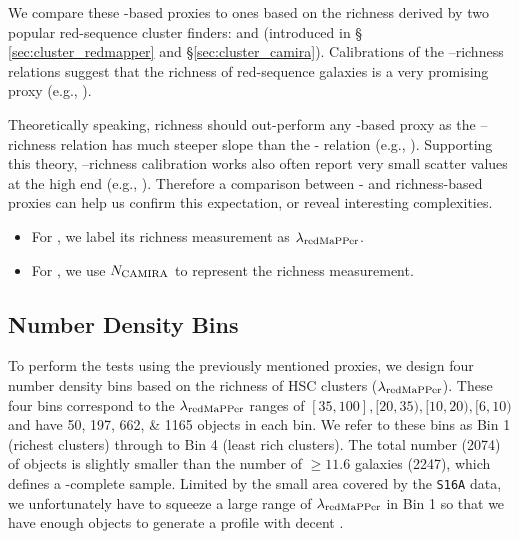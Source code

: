\documentclass[fleqn,usenatbib,useAMS,english]{mnras}
\begin{document}
    We compare these \mstar{}-based proxies to ones based on the richness derived by two popular
    red-sequence cluster finders: \redm{} and \camira{} (introduced in \S
    \ref{sec:cluster_redmapper} and \S \ref{sec:cluster_camira}).
    Calibrations of the \mvir{}--richness relations suggest that the richness of
    red-sequence galaxies is a very promising \mvir{} proxy (e.g., \addref{}).

    Theoretically speaking, richness should out-perform any \mstar{}-based \mvir{} proxy
    as the \mvir{}--richness relation has much steeper slope than the \mvir{}-\mstar{} relation
    (e.g., \addref{}).
    Supporting this theory, \mvir{}--richness calibration works also often report very small
    scatter values at the high \mvir{} end (e.g., \addref{}).
    Therefore a \topn{} comparison between \mvir{}- and richness-based proxies can help us
    confirm this expectation, or reveal interesting complexities.

    \begin{itemize}

        \item For \redm{}, we label its richness measurement as $\lambda_{\rm redMaPPer}$.

        \item For \camira{}, we use $N_{\rm CAMIRA}$ to represent the richness measurement.

    \end{itemize}

\subsection{Number Density Bins}
    \label{sec:binning}

    To perform the \topn{} tests using the previously mentioned proxies, we design four number
    density bins based on the richness of HSC \redm{} clusters ($\lambda_{\rm redMaPPer}$).
    These four bins correspond to the $\lambda_{\rm redMaPPer}$ ranges of $[35, 100], [20, 35),
    [10, 20), [6, 10)$ and have 50, 197, 662, \& 1165 objects in each bin.
    We refer to these bins as Bin 1 (richest clusters) through to Bin 4 (least rich clusters).
    The total number (2074) of objects is slightly smaller than the number of $\geq
    11.6$ galaxies (2247), which defines a \mstar{}-complete sample.
    Limited by the small area covered by the \texttt{S16A} data, we unfortunately have to squeeze
    a large range of $\lambda_{\rm redMaPPer}$ in Bin 1 so that we have enough objects
    to generate a \dsigma{} profile with decent \snratio{}.
\end{document}
